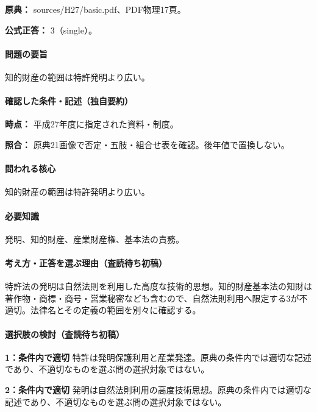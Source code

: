 \noindent\textbf{原典：} sources/H27/basic.pdf、PDF物理17頁。

\textbf{公式正答：} 3（single）。

\paragraph{問題の要旨} 知的財産の範囲は特許発明より広い。

\paragraph{確認した条件・記述（独自要約）}\mbox{}\par

\noindent\textbf{時点：} 平成27年度に指定された資料・制度。\par

\noindent\textbf{照合：} 原典21画像で否定・五肢・組合せ表を確認。後年値で置換しない。\par

\paragraph{問われる核心} 知的財産の範囲は特許発明より広い。

\paragraph{必要知識} 発明、知的財産、産業財産権、基本法の責務。

\paragraph{考え方・正答を選ぶ理由（査読待ち初稿）} 特許法の発明は自然法則を利用した高度な技術的思想。知的財産基本法の知財は著作物・商標・商号・営業秘密なども含むので、自然法則利用へ限定する3が不適切。法律名とその定義の範囲を別々に確認する。

\paragraph{選択肢の検討（査読待ち初稿）}\mbox{}\par

\noindent\textbf{1：条件内で適切} 特許は発明保護利用と産業発達。原典の条件内では適切な記述であり、不適切なものを選ぶ問の選択対象ではない。\par

\noindent\textbf{2：条件内で適切} 発明は自然法則利用の高度技術思想。原典の条件内では適切な記述であり、不適切なものを選ぶ問の選択対象ではない。\par

